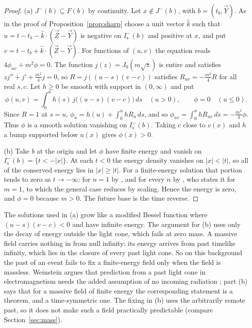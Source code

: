 \documentclass[11pt]{article}
\theoremstyle{definition}
\newcommand{\Is}{I^-_{\mathrm s}}
\begin{document}
\begin{proof}
(a) $J^-(b)\subseteq F(b)$ by continuity. Let $x\notin J^-(b)$, with $b=(t_b,\vec Y)$.
As in the proof of Proposition~\ref{prop:sharp} choose a unit vector $\hat k$
such that $u=t-t_b-\hat k\cdot(\vec Z-\vec Y)$ is negative on $\Is(b)$ and positive
at $x$, and put $v=t-t_b+\hat k\cdot(\vec Z-\vec Y)$. For functions of $(u,v)$ the
equation reads $4\phi_{uv}+m^2\phi=0$. The function $j(z)=J_0(m\sqrt z)$ is entire
and satisfies $zj''+j'+\tfrac{m^2}{4}j=0$, so $R=j((u-s)(v-c))$ satisfies
$R_{uv}=-\tfrac{m^2}{4}R$ for all real $s,c$. Let $h\ge0$ be smooth with support in
$(0,\infty)$ and put
\[
\phi(u,v)=\int_0^u h(s)\,j\bigl((u-s)(v-c)\bigr)\,ds\quad(u>0),\qquad \phi=0\quad(u\le0).
\]
Since $R=1$ at $s=u$, $\phi_u=h(u)+\int_0^uhR_u\,ds$, and so
$\phi_{uv}=\int_0^uhR_{uv}\,ds=-\tfrac{m^2}{4}\phi$. Thus $\phi$ is a smooth solution
vanishing on $\Is(b)$. Taking $c$ close to $v(x)$ and $h$ a bump supported below
$u(x)$ gives $\phi(x)>0$.

(b) Take $b$ at the origin and let $\phi$ have finite energy and vanish on
$\Is(b)=\{t<-|x|\}$. At each $t<0$ the energy density vanishes on $|x|<|t|$, so all
of the conserved energy lies in $|x|\ge|t|$. For a finite-energy solution that
portion tends to zero as $t\to-\infty$: for $n=1$ by \citet[Theorem~1, with time
reversed]{Burnol2006}, and for every $n$ by \citet[Remark~1.10]{Yang2023}, who states it for $m=1$, to which
the general case reduces by scaling. Hence the energy is zero, and $\phi=0$ because $m>0$. The
future base is the time reverse.
\end{proof}

The solutions used in (a) grow like a modified Bessel function where
$(u-s)(v-c)<0$ and have infinite energy. The argument for (b) uses only the decay
of energy outside the light cone, which fails at zero mass.
A massive field carries nothing in from null infinity: its energy arrives from
past timelike infinity, which lies in the closure of every past light cone. So on
this background the past of an event fails to fix a finite-energy field only when
the field is massless. Weinstein argues that prediction from a past light cone in
electromagnetism needs the added assumption of no incoming radiation
\citep{Weinstein2011}; part (b) says that for a massive field of finite energy the
corresponding statement is a theorem, and a time-symmetric one. The fixing in (b)
uses the arbitrarily remote past, so it does not make such a field practically
predictable (compare Section~\ref{sec:mass}).
\end{document}
